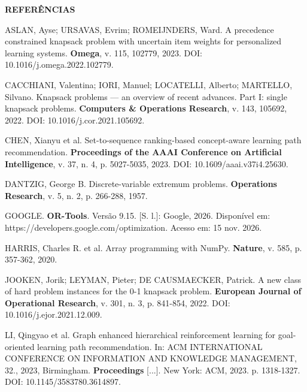 \documentclass[12pt,a4paper]{article}
\begin{document}
\clearpage
\begin{center}{\bfseries REFERÊNCIAS}\end{center}\vspace{0.5em}
\begin{singlespace}\raggedright
\noindent ASLAN, Ayse; URSAVAS, Evrim; ROMEIJNDERS, Ward. A precedence constrained knapsack problem with uncertain item weights for personalized learning systems. \textbf{Omega}, v. 115, 102779, 2023. DOI: 10.1016/j.omega.2022.102779.\par\vspace{1em}
\noindent CACCHIANI, Valentina; IORI, Manuel; LOCATELLI, Alberto; MARTELLO, Silvano. Knapsack problems --- an overview of recent advances. Part I: single knapsack problems. \textbf{Computers \& Operations Research}, v. 143, 105692, 2022. DOI: 10.1016/j.cor.2021.105692.\par\vspace{1em}
\noindent CHEN, Xianyu et al. Set-to-sequence ranking-based concept-aware learning path recommendation. \textbf{Proceedings of the AAAI Conference on Artificial Intelligence}, v. 37, n. 4, p. 5027-5035, 2023. DOI: 10.1609/aaai.v37i4.25630.\par\vspace{1em}
\noindent DANTZIG, George B. Discrete-variable extremum problems. \textbf{Operations Research}, v. 5, n. 2, p. 266-288, 1957.\par\vspace{1em}
\noindent GOOGLE. \textbf{OR-Tools}. Versão 9.15. [S. l.]: Google, 2026. Disponível em: https://developers.google.com/optimization. Acesso em: 15 nov. 2026.\par\vspace{1em}
\noindent HARRIS, Charles R. et al. Array programming with NumPy. \textbf{Nature}, v. 585, p. 357-362, 2020.\par\vspace{1em}
\noindent JOOKEN, Jorik; LEYMAN, Pieter; DE CAUSMAECKER, Patrick. A new class of hard problem instances for the 0-1 knapsack problem. \textbf{European Journal of Operational Research}, v. 301, n. 3, p. 841-854, 2022. DOI: 10.1016/j.ejor.2021.12.009.\par\vspace{1em}
\noindent LI, Qingyao et al. Graph enhanced hierarchical reinforcement learning for goal-oriented learning path recommendation. In: ACM INTERNATIONAL CONFERENCE ON INFORMATION AND KNOWLEDGE MANAGEMENT, 32., 2023, Birmingham. \textbf{Proceedings} [...]. New York: ACM, 2023. p. 1318-1327. DOI: 10.1145/3583780.3614897.\par\vspace{1em}

\end{singlespace}
\end{document}
